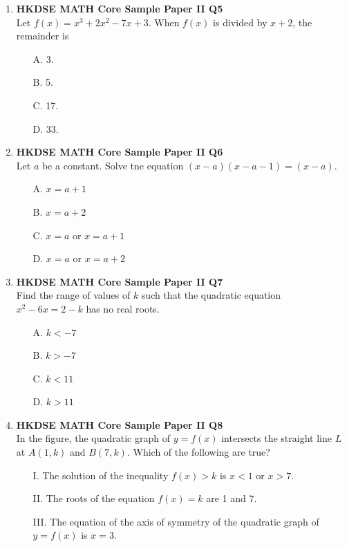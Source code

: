 \documentclass[12pt]{article}
\begin{document}
\begin{enumerate}
	\item \textbf{HKDSE MATH Core Sample Paper II Q5}\\
	Let $f(x) = x^3 + 2x^2 - 7x + 3$. When $f(x)$ is divided by $x + 2$, the remainder is 
	\begin{enumerate}
		\item[A.] 3.
		\item[B.] 5.
		\item[C.] 17.
		\item[D.] 33.
	\end{enumerate}

	\item \textbf{HKDSE MATH Core Sample Paper II Q6}\\
	Let $a$ be a constant. Solve tne equation $(x - a)(x - a - 1) = (x - a)$.
	\begin{enumerate}
		\item[A.] $x = a + 1$
		\item[B.] $x = a + 2$
		\item[C.] $x = a$ or $x = a + 1$
		\item[D.] $x = a$ or $x = a + 2$
	\end{enumerate}

	\item \textbf{HKDSE MATH Core Sample Paper II Q7}\\
	Find the range of values of $k$ such that the quadratic equation $x^2 - 6x = 2 - k$ has no real roots.
	\begin{enumerate}
		\item[A.] $k < -7$
		\item[B.] $k > -7$
		\item[C.] $k < 11$
		\item[D.] $k > 11$
	\end{enumerate}

	\item \textbf{HKDSE MATH Core Sample Paper II Q8}\\
	In the figure, the quadratic graph of $y = f(x)$ intersects the straight line $L$ at $A(1 , k)$ and $B(7 , k)$. Which of the following are true?
	\begin{enumerate}
		\item[I.] The solution of the inequality $f(x) > k$ is $x < 1$ or $x > 7$.
		\item[II.] The roots of the equation $f(x) = k$ are 1 and 7.
		\item[III.] The equation of the axis of symmetry of the quadratic graph of $y = f(x)$ is $x = 3$.
		\item[]


\end{enumerate}
\end{enumerate}
\end{document}
